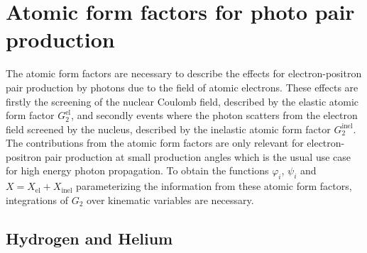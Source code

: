 \chapter{Atomic form factors for photo pair production}
\label{sec:atomic_form_factors}

The atomic form factors are necessary to describe the effects for electron-positron pair production by photons due to the field of atomic electrons.
These effects are firstly the screening of the nuclear Coulomb field, described by the elastic atomic form factor $G_2^{\text{el}}$, and secondly events where the photon scatters from the electron field screened by the nucleus, described by the inelastic atomic form factor $G_2^{\text{inel}}$.
The contributions from the atomic form factors are only relevant for electron-positron pair production at small production angles which is the usual use case for high energy photon propagation.
To obtain the functions $\varphi_i$, $\psi_i$ and $X = X_{\text{el}} + X_{\text{inel}}$ parameterizing the information from these atomic form factors, integrations of $G_2$ over kinematic variables are necessary.

\section{Hydrogen and Helium}

